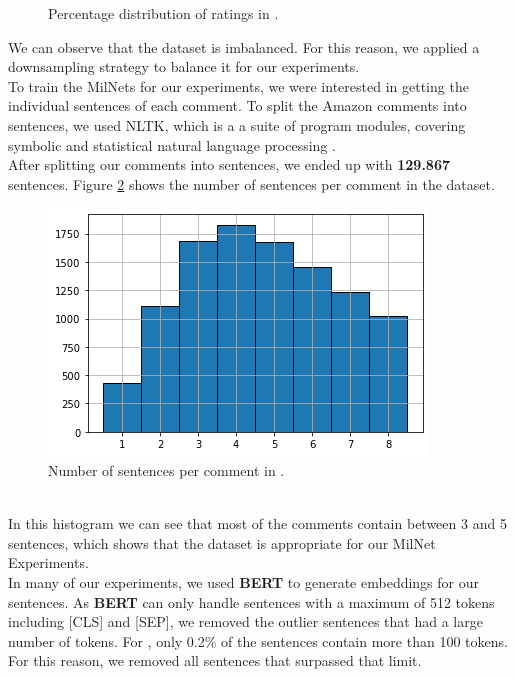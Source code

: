 \begin{figure}[h]
\centering
{}
\caption{Percentage distribution of ratings in \dataEN.}
\label{amazon_en_pie_chart}
\end{figure}
We can observe that the dataset is imbalanced. For this reason, we applied a downsampling strategy to balance it for our experiments.\\
To train the MilNets for our experiments, we were interested in getting the individual sentences of each comment. To split the Amazon comments into sentences, we used NLTK, which is a a suite of program modules, covering symbolic and statistical natural language processing \cite{NLTKarticle}.\\
After splitting our comments into sentences, we ended up with {\bf 129.867} sentences. Figure \ref{sentences_per_comment_amazon_en} shows the number of sentences per comment in the dataset.
\begin{figure}[h]
\centerline{\includegraphics[scale=.4]{images/sentences_per_comment_amazon_en.png}}
\caption{Number of sentences per comment in \dataEN.}
\label{sentences_per_comment_amazon_en}
\end{figure}\\
In this histogram we can see that most of the comments contain between 3 and 5 sentences, which shows that the dataset is appropriate for our MilNet Experiments.\\
In many of our experiments, we used {\bf BERT} to generate embeddings for our sentences. As {\bf BERT} can only handle sentences with a maximum of 512 tokens including [CLS] and [SEP], we removed the outlier sentences that had a large number of tokens. For \dataEN, only 0.2\% of the sentences contain more than 100 tokens. For this reason, we removed all sentences that surpassed that limit.\\

